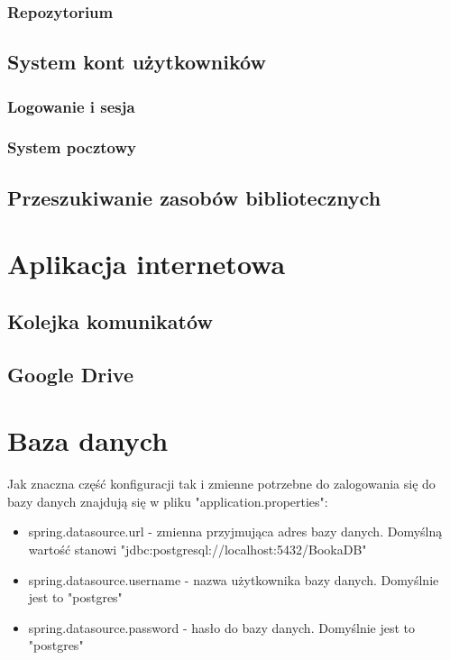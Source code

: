 \documentclass{report}
\begin{document}
			\subsubsection{Repozytorium}
			
		\subsection{System kont użytkowników}
		
			\subsubsection{Logowanie i sesja}
			
			\subsubsection{System pocztowy}
		
		\subsection{Przeszukiwanie zasobów bibliotecznych}
		
		
	\section{Aplikacja internetowa}
	
	
		\subsection{Kolejka komunikatów}
		
		\subsection{Google Drive}
	
	\section{Baza danych}
	
		Jak znaczna część konfiguracji tak i zmienne potrzebne do zalogowania się do bazy danych znajdują się w pliku "application.properties":

		\begin{itemize}
			\item spring.datasource.url - zmienna przyjmująca adres bazy danych. Domyślną wartość stanowi "jdbc:postgresql://localhost:5432/BookaDB"
			\item spring.datasource.username - nazwa użytkownika bazy danych. Domyślnie jest to "postgres"
			\item spring.datasource.password - hasło do bazy danych. Domyślnie jest to "postgres"
		\end{itemize}
\end{document}
